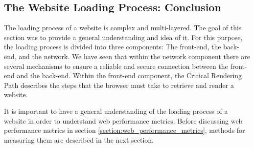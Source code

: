 \subsection{The Website Loading Process: Conclusion} %

The loading process of a website is complex and multi-layered.
The goal of this section was to provide a general understanding and idea of it.
For this purpose, the loading process is divided into three components: The front-end, the back-end, and the network.
We have seen that within the network component there are several mechanisms to ensure a reliable and secure connection between the front-end and the back-end.
Within the front-end component, the Critical Rendering Path describes the steps that the browser must take to retrieve and render a website.


It is important to have a general understanding of the loading process of a website in order to understand web performance metrics.
Before discussing web performance metrics in section \ref{section:web_performance_metrics}, methods for measuring them are described in the next section.






